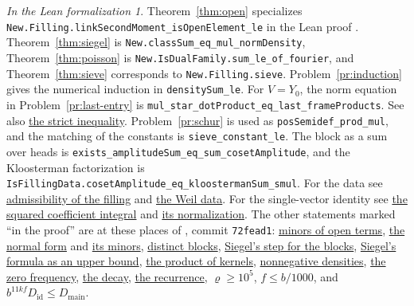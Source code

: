 \documentclass[reqno]{amsart}
\theoremstyle{definition}
\theoremstyle{plain}
\theoremstyle{remark}
\newtheorem*{leanremark}{In the Lean formalization}
\newcommand{\Dm}{D_{\mathrm{main}}}
\newcommand{\Di}{D_{\mathrm{id}}}
\newcommand{\tl}[1]{\texttt{#1}}
\newcommand{\glsrc}[3]{\href{https://github.com/lsernau/grh-lean/blob/72fead1/grh/src/#1\#L#2}{#3}}
\begin{document}
\begin{leanremark}
{\raggedright Theorem~\ref{thm:open} specializes \tl{New.Filling.linkSecondMoment\_isOpenElement\_le} in the Lean proof \cite{GL}.  Theorem~\ref{thm:siegel} is \tl{New.classSum\_eq\_mul\_normDensity}, Theorem~\ref{thm:poisson} is \tl{New.IsDualFamily.sum\_le\_of\_fourier}, and Theorem~\ref{thm:sieve} corresponds to \tl{New.Filling.sieve}.  Problem~\ref{pr:induction} gives the numerical induction in \tl{densitySum\_le}.  For \(V=Y_0\), the norm equation in Problem~\ref{pr:last-entry} is \tl{mul\_star\_dotProduct\_eq\_last\_frameProducts}.  See also \glsrc{New/Spanning/MainTerm/GlobalToLocal.lean}{297}{the strict inequality}.  Problem~\ref{pr:schur} is used as \tl{posSemidef\_prod\_mul}, and the matching of the constants is \tl{sieve\_constant\_le}.  The block as a sum over heads is \tl{exists\_amplitudeSum\_eq\_sum\_cosetAmplitude}, and the Kloosterman factorization is \tl{IsFillingData.cosetAmplitude\_eq\_kloostermanSum\_smul}.  For the data see \glsrc{New/Spanning/Unfolding/FillingAdmissible.lean}{743}{admissibility of the filling} and \glsrc{New/Derivatives/Field/WeilData.lean}{420}{the Weil data}.  For the single-vector identity see \glsrc{New/Spanning/Bessel/SchurBound.lean}{237}{the squared coefficient integral} and \glsrc{New/Spanning/Bessel/FillingData.lean}{403}{its normalization}.  The other statements marked ``in the proof'' are at these places of \cite{GL}, commit \texttt{72fead1}: \glsrc{New/Spanning/MainTerm/EnergyEstimate.lean}{90}{minors of open terms}, \glsrc{Lib/DiscreteSeries/Bruhat/BigCell.lean}{289}{the normal form} and \glsrc{Lib/DiscreteSeries/Bruhat/BigCell.lean}{90}{its minors}, \glsrc{New/Spanning/MainTerm/EnergyEstimate.lean}{666}{distinct blocks}, \glsrc{New/Spanning/MainTerm/EnergyEstimate.lean}{479}{Siegel's step for the blocks}, \glsrc{New/Spanning/MainTerm/SiegelTopBound.lean}{738}{Siegel's formula as an upper bound}, \glsrc{New/Spanning/MainTerm/SieveSystem.lean}{147}{the product of kernels}, \glsrc{New/Spanning/MainTerm/GlobalSieve.lean}{580}{nonnegative densities}, \glsrc{New/Spanning/MainTerm/SieveSystem.lean}{66}{the zero frequency}, \glsrc{New/Spanning/MainTerm/GlobalSieve.lean}{1177}{the decay}, \glsrc{New/Spanning/MainTerm/GlobalSieve.lean}{731}{the recurrence}, \glsrc{New/Spanning/Unfolding/Setup.lean}{113}{\(\varrho\ge10^5\)}, \glsrc{New/Spanning/Unfolding/Setup.lean}{128}{\(f\le b/1000\)}, and \glsrc{New/Spanning/Unfolding/Setup.lean}{515}{\(b^{11kf}\Di\le\Dm\)}.\par}
\end{leanremark}
\end{document}
